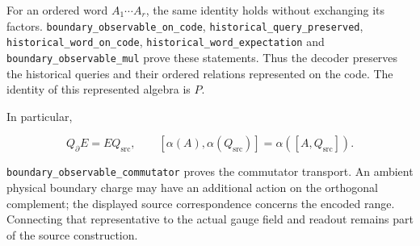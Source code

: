 \documentclass[
]{article}
\begin{document}
For an ordered word \(A_1\cdots A_r\), the same identity holds without
exchanging its factors.
\texttt{b\allowbreak{}o\allowbreak{}u\allowbreak{}n\allowbreak{}d\allowbreak{}a\allowbreak{}r\allowbreak{}y\allowbreak{}\_\allowbreak{}o\allowbreak{}b\allowbreak{}s\allowbreak{}e\allowbreak{}r\allowbreak{}v\allowbreak{}a\allowbreak{}b\allowbreak{}l\allowbreak{}e\allowbreak{}\_\allowbreak{}o\allowbreak{}n\allowbreak{}\_\allowbreak{}c\allowbreak{}o\allowbreak{}d\allowbreak{}e},
\texttt{h\allowbreak{}i\allowbreak{}s\allowbreak{}t\allowbreak{}o\allowbreak{}r\allowbreak{}i\allowbreak{}c\allowbreak{}a\allowbreak{}l\allowbreak{}\_\allowbreak{}q\allowbreak{}u\allowbreak{}e\allowbreak{}r\allowbreak{}y\allowbreak{}\_\allowbreak{}p\allowbreak{}r\allowbreak{}e\allowbreak{}s\allowbreak{}e\allowbreak{}r\allowbreak{}v\allowbreak{}e\allowbreak{}d},
\texttt{h\allowbreak{}i\allowbreak{}s\allowbreak{}t\allowbreak{}o\allowbreak{}r\allowbreak{}i\allowbreak{}c\allowbreak{}a\allowbreak{}l\allowbreak{}\_\allowbreak{}w\allowbreak{}o\allowbreak{}r\allowbreak{}d\allowbreak{}\_\allowbreak{}o\allowbreak{}n\allowbreak{}\_\allowbreak{}c\allowbreak{}o\allowbreak{}d\allowbreak{}e},
\texttt{h\allowbreak{}i\allowbreak{}s\allowbreak{}t\allowbreak{}o\allowbreak{}r\allowbreak{}i\allowbreak{}c\allowbreak{}a\allowbreak{}l\allowbreak{}\_\allowbreak{}w\allowbreak{}o\allowbreak{}r\allowbreak{}d\allowbreak{}\_\allowbreak{}e\allowbreak{}x\allowbreak{}p\allowbreak{}e\allowbreak{}c\allowbreak{}t\allowbreak{}a\allowbreak{}t\allowbreak{}i\allowbreak{}o\allowbreak{}n}
and
\texttt{b\allowbreak{}o\allowbreak{}u\allowbreak{}n\allowbreak{}d\allowbreak{}a\allowbreak{}r\allowbreak{}y\allowbreak{}\_\allowbreak{}o\allowbreak{}b\allowbreak{}s\allowbreak{}e\allowbreak{}r\allowbreak{}v\allowbreak{}a\allowbreak{}b\allowbreak{}l\allowbreak{}e\allowbreak{}\_\allowbreak{}m\allowbreak{}u\allowbreak{}l}
prove these statements. Thus the decoder preserves the historical
queries and their ordered relations represented on the code. The
identity of this represented algebra is \(P\).

In particular,

\[
Q_\partial E=EQ_{\mathrm{src}},\qquad
[\alpha(A),\alpha(Q_{\mathrm{src}})]=\alpha([A,Q_{\mathrm{src}}]).
\]

\texttt{b\allowbreak{}o\allowbreak{}u\allowbreak{}n\allowbreak{}d\allowbreak{}a\allowbreak{}r\allowbreak{}y\allowbreak{}\_\allowbreak{}o\allowbreak{}b\allowbreak{}s\allowbreak{}e\allowbreak{}r\allowbreak{}v\allowbreak{}a\allowbreak{}b\allowbreak{}l\allowbreak{}e\allowbreak{}\_\allowbreak{}c\allowbreak{}o\allowbreak{}m\allowbreak{}m\allowbreak{}u\allowbreak{}t\allowbreak{}a\allowbreak{}t\allowbreak{}o\allowbreak{}r}
proves the commutator transport. An ambient physical boundary charge may
have an additional action on the orthogonal complement; the displayed
source correspondence concerns the encoded range. Connecting that
representative to the actual gauge field and readout remains part of the
source construction.
\end{document}
